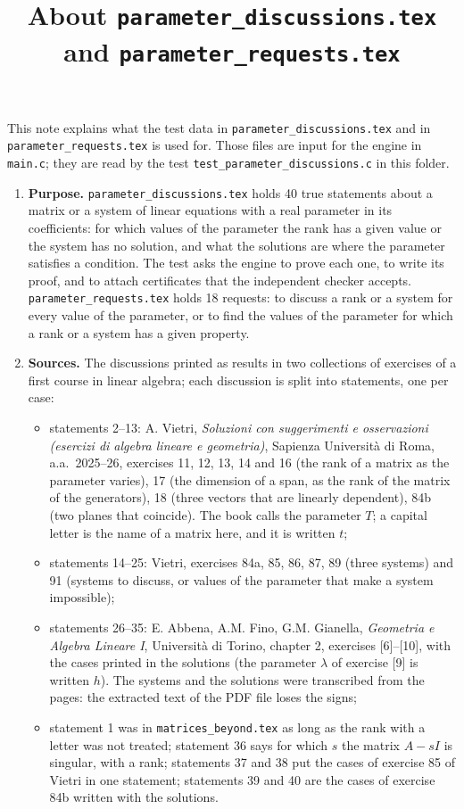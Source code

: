 \documentclass[11pt,a4paper]{article}
\title{About \texttt{parameter\_discussions.tex} and \texttt{parameter\_requests.tex}}
\author{}
\date{}
\begin{document}
\maketitle
This note explains what the test data in \texttt{parameter\_discussions.tex} and in \texttt{parameter\_requests.tex} is used for. Those files are input for the engine in \texttt{main.c}; they are read by the test \texttt{test\_parameter\_discussions.c} in this folder.

\begin{enumerate}
\item \textbf{Purpose.} \texttt{parameter\_discussions.tex} holds 40 true statements about a matrix or a system of linear equations with a real parameter in its coefficients: for which values of the parameter the rank has a given value or the system has no solution, and what the solutions are where the parameter satisfies a condition. The test asks the engine to prove each one, to write its proof, and to attach certificates that the independent checker accepts. \texttt{parameter\_requests.tex} holds 18 requests: to discuss a rank or a system for every value of the parameter, or to find the values of the parameter for which a rank or a system has a given property.

\item \textbf{Sources.} The discussions printed as results in two collections of exercises of a first course in linear algebra; each discussion is split into statements, one per case:
\begin{itemize}
\item statements 2--13: A. Vietri, \emph{Soluzioni con suggerimenti e osservazioni (esercizi di algebra lineare e geometria)}, Sapienza Universit\`a di Roma, a.a.\ 2025--26, exercises 11, 12, 13, 14 and 16 (the rank of a matrix as the parameter varies), 17 (the dimension of a span, as the rank of the matrix of the generators), 18 (three vectors that are linearly dependent), 84b (two planes that coincide). The book calls the parameter $T$; a capital letter is the name of a matrix here, and it is written $t$;
\item statements 14--25: Vietri, exercises 84a, 85, 86, 87, 89 (three systems) and 91 (systems to discuss, or values of the parameter that make a system impossible);
\item statements 26--35: E. Abbena, A.M. Fino, G.M. Gianella, \emph{Geometria e Algebra Lineare I}, Universit\`a di Torino, chapter 2, exercises [6]--[10], with the cases printed in the solutions (the parameter $\lambda$ of exercise [9] is written $h$). The systems and the solutions were transcribed from the pages: the extracted text of the PDF file loses the signs;
\item statement 1 was in \texttt{matrices\_beyond.tex} as long as the rank with a letter was not treated; statement 36 says for which $s$ the matrix $A - sI$ is singular, with a rank; statements 37 and 38 put the cases of exercise 85 of Vietri in one statement; statements 39 and 40 are the cases of exercise 84b written with the solutions.
\end{itemize}


\end{enumerate}
\end{document}
